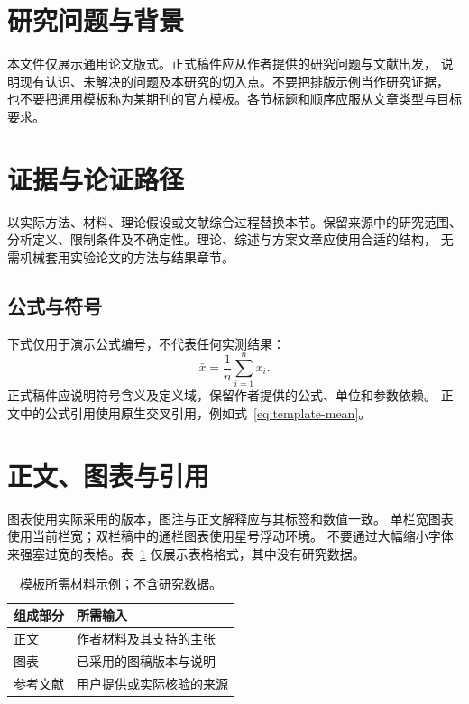 \ifLWChinese
\section{研究问题与背景}
本文件仅展示通用论文版式。正式稿件应从作者提供的研究问题与文献出发，
说明现有认识、未解决的问题及本研究的切入点。不要把排版示例当作研究证据，
也不要把通用模板称为某期刊的官方模板。各节标题和顺序应服从文章类型与目标要求。

\section{证据与论证路径}
以实际方法、材料、理论假设或文献综合过程替换本节。保留来源中的研究范围、
分析定义、限制条件及不确定性。理论、综述与方案文章应使用合适的结构，
无需机械套用实验论文的方法与结果章节。

\subsection{公式与符号}
下式仅用于演示公式编号，不代表任何实测结果：
\begin{equation}
  \bar{x} = \frac{1}{n}\sum_{i=1}^{n} x_i .
  \label{eq:template-mean}
\end{equation}
正式稿件应说明符号含义及定义域，保留作者提供的公式、单位和参数依赖。
正文中的公式引用使用原生交叉引用，例如式~\eqref{eq:template-mean}。

\section{正文、图表与引用}
图表使用实际采用的版本，图注与正文解释应与其标签和数值一致。
单栏宽图表使用当前栏宽；双栏稿中的通栏图表使用星号浮动环境。
不要通过大幅缩小字体来强塞过宽的表格。表~\ref{tab:template-inputs}
仅展示表格格式，其中没有研究数据。

\begin{table}[bp]
  \centering
  \caption{模板所需材料示例；不含研究数据。}
  \label{tab:template-inputs}
  \small
  \begin{tabularx}{\linewidth}{@{}lX@{}}
    \toprule
    组成部分 & 所需输入 \\
    \midrule
    正文 & 作者材料及其支持的主张 \\
    图表 & 已采用的图稿版本与说明 \\
    参考文献 & 用户提供或实际核验的来源 \\
    \bottomrule
  \end{tabularx}
\end{table}

